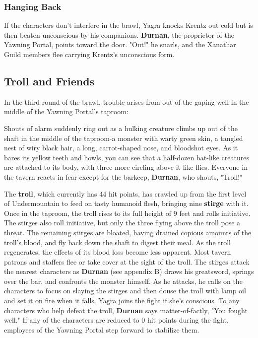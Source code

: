 \documentclass[10pt,a4paper,twoside,twocolumn,openany,nodeprecatedcode]{dndbook}
\begin{document}
\subsubsection{Hanging Back}
If the characters don't interfere in the brawl, Yagra knocks Krentz out cold but is then beaten unconscious by his companions. \textbf{Durnan}, the proprietor of the Yawning Portal, points toward the door. "Out!" he snarls, and the Xanathar Guild members flee carrying Krentz's unconscious form.
\subsection{Troll and Friends}
In the third round of the brawl, trouble arises from out of the gaping well in the middle of the Yawning Portal's taproom:
\begin{DndReadAloud}{}
Shouts of alarm suddenly ring out as a hulking creature climbs up out of the shaft in the middle of the taproom-a monster with warty green skin, a tangled nest of wiry black hair, a long, carrot-shaped nose, and bloodshot eyes. As it bares its yellow teeth and howls, you can see that a half-dozen bat-like creatures are attached to its body, with three more circling above it like flies. Everyone in the tavern reacts in fear except for the barkeep, \textbf{Durnan}, who shouts, "Troll!"
\end{DndReadAloud}

The \textbf{troll}, which currently has 44 hit points, has crawled up from the first level of Undermountain to feed on tasty humanoid flesh, bringing nine \textbf{stirge} with it. Once in the taproom, the troll rises to its full height of 9 feet and rolls initiative. The stirges also roll initiative, but only the three flying above the troll pose a threat. The remaining stirges are bloated, having drained copious amounts of the troll's blood, and fly back down the shaft to digest their meal. As the troll regenerates, the effects of its blood loss become less apparent.
Most tavern patrons and staffers flee or take cover at the sight of the troll. The stirges attack the nearest characters as \textbf{Durnan} (see appendix B) draws his greatsword, springs over the bar, and confronts the monster himself. As he attacks, he calls on the characters to focus on slaying the stirges and then douse the troll with lamp oil and set it on fire when it falls. Yagra joins the fight if she's conscious. To any characters who help defeat the troll, \textbf{Durnan} says matter-of-factly, "You fought well."
If any of the characters are reduced to 0 hit points during the fight, employees of the Yawning Portal step forward to stabilize them.
\end{document}

